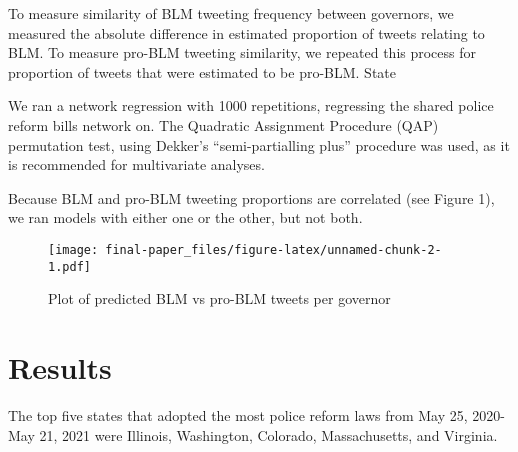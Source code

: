 \documentclass[12pt]{article}
\begin{document}
To measure similarity of BLM tweeting frequency between governors, we
measured the absolute difference in estimated proportion of tweets
relating to BLM. To measure pro-BLM tweeting similarity, we repeated
this process for proportion of tweets that were estimated to be pro-BLM.
State

We ran a network regression with 1000 repetitions, regressing the shared
police reform bills network on. The Quadratic Assignment Procedure (QAP)
permutation test, using Dekker's ``semi-partialling plus'' procedure was
used, as it is recommended for multivariate analyses.

Because BLM and pro-BLM tweeting proportions are correlated (see Figure
1), we ran models with either one or the other, but not both.

\begin{figure}
\centering
\texttt{[image: final-paper\_files/figure-latex/unnamed-chunk-2-1.pdf]}
\caption{Plot of predicted BLM vs pro-BLM tweets per governor}
\end{figure}

\hypertarget{results}{%
\section{Results}\label{results}}

The top five states that adopted the most police reform laws from May
25, 2020-May 21, 2021 were Illinois, Washington, Colorado,
Massachusetts, and Virginia.
\end{document}
